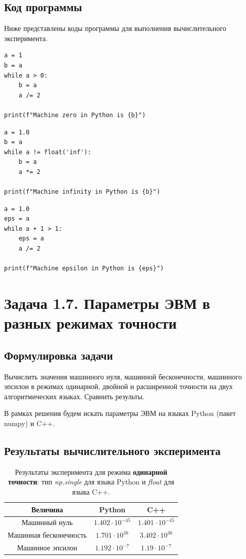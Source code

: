\documentclass[12pt]{article}%
\begin{document}
\subsection{Код программы}
Ниже представлены коды программы для выполнения вычислительного эксперимента.

\begin{verbatim}
a = 1
b = a
while a > 0:
    b = a
    a /= 2

print(f"Machine zero in Python is {b}")
\end{verbatim}
\newpage
\begin{verbatim}
a = 1.0
b = a
while a != float('inf'):
    b = a
    a *= 2

print(f"Machine infinity in Python is {b}")
\end{verbatim}

\begin{verbatim}
a = 1.0
eps = a
while a + 1 > 1:
    eps = a
    a /= 2

print(f"Machine epsilon in Python is {eps}")
\end{verbatim}

\newpage
\section{Задача 1.7. Параметры ЭВМ в разных режимах точности}
\subsection{Формулировка задачи}
Вычислить значения машинного нуля, машинной бесконечности, машинного эпсилон в режимах одинарной, двойной и расширенной точности на двух алгоритмических языках. Сравнить результы.

В рамках решения будем искать параметры ЭВМ на языках Python (пакет numpy) и C++.


\subsection{Результаты вычислительного эксперимента}

\begin{table}[h]
\centering
\begin{tabular}{|c|c|c|}
\hline Величина             & Python         & C++  \\
\hline Машинный нуль 
    & $1.402 \cdot 10^{-45}$ & $1.401 \cdot 10^{-45}$ \\
\hline Машинная бесконечность 
    & $1.701 \cdot 10^{38}$  & $3.402 \cdot 10^{38}$ \\
\hline Машинное эпсилон 
    & $1.192 \cdot 10^{-7}$  & $1.19 \cdot 10^{-7}$ \\
\hline
    \end{tabular}
    \caption{Результаты эксперимента для режима \textbf{одинарной точности}: тип \textit{np.single} для языка Python и \textit{float} для языка C++.}
\end{table}
\end{document}
